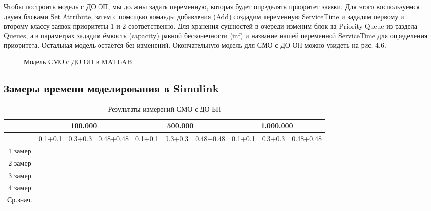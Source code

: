 \documentclass[a4paper,14pt]{report} %
\begin{document}
Чтобы построить модель с ДО ОП, мы должны задать переменную, которая будет определять приоритет заявки. Для этого воспользуемся двумя блоками Set Attribute, затем с помощью команды добавления (Add) создадим переменную ServiceTime и зададим первому и второму классу заявок приоритеты 1 и 2 соответственно. Для хранения сущностей в очереди изменим блок на Priority Queue из раздела Queues, а в параметрах зададим ёмкость (capacity) равной бесконечности (inf) и название нашей переменной ServiceTime для определения приоритета. Остальная модель остаётся без изменений. Окончательную модель для СМО с ДО ОП можно увидеть на рис. 4.6.
\begin{figure}[h] %
\caption{Модель СМО с ДО ОП в MATLAB}
\label{ris:matlab_pri}
\end{figure} %

\subsection{Замеры времени моделирования в Simulink}
\begin{table}[h!]
\caption{Результаты измерений СМО с ДО БП}
\begin{tabular}{|c|c|c|c|c|c|c|c|c|c|}
\hline
 & \multicolumn{3}{|c|}{100.000} & \multicolumn{3}{|c|}{500.000} & \multicolumn{3}{|c|}{1.000.000} \\
\hline
 & 0.1+0.1 & 0.3+0.3 & 0.48+0.48 & 0.1+0.1 & 0.3+0.3 & 0.48+0.48 & 0.1+0.1 & 0.3+0.3 & 0.48+0.48 \\
\hline
1 замер &  &  &  &  &  &  &  &  &   \\
\hline
2 замер &   &  &  &  &  &  &  &  &    \\
\hline
3 замер & &  &  &  &  &  &  &  &   \\
\hline
4 замер &   &  &  &  &  &  &  &  &  \\
\hline
Ср.знач. &   &  &  &  &  &  &  &  &   \\
\hline
\end{tabular}
\end{table} 
\end{document}
